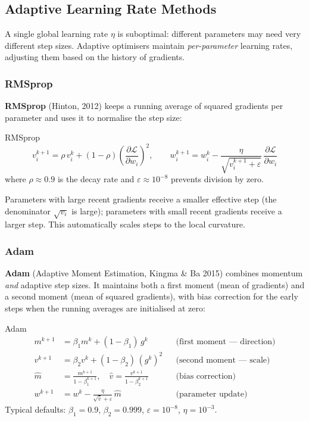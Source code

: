 \documentclass[11pt,a4paper]{article}
\newcommand{\term}[1]{\textcolor{DefGreen}{\textbf{#1}}\index{#1}}
\begin{document}
\subsection{Adaptive Learning Rate Methods}

A single global learning rate $\eta$ is suboptimal: different parameters may need very different step sizes. Adaptive optimisers maintain \emph{per-parameter} learning rates, adjusting them based on the history of gradients.

\subsubsection{RMSprop}

\term{RMSprop} (Hinton, 2012) keeps a running average of squared gradients per parameter and uses it to normalise the step size:

\begin{defbox}{RMSprop}
\[
v_i^{k+1} = \rho\, v_i^k + (1-\rho)\left(\frac{\partial \mathcal{L}}{\partial w_i}\right)^{\!2}, \qquad
w_i^{k+1} = w_i^k - \frac{\eta}{\sqrt{v_i^{k+1} + \varepsilon}}\,\frac{\partial \mathcal{L}}{\partial w_i}
\]
where $\rho \approx 0.9$ is the decay rate and $\varepsilon \approx 10^{-8}$ prevents division by zero.
\end{defbox}

Parameters with large recent gradients receive a smaller effective step (the denominator $\sqrt{v_i}$ is large); parameters with small recent gradients receive a larger step. This automatically scales steps to the local curvature.

\subsubsection{Adam}

\term{Adam} (Adaptive Moment Estimation, Kingma \& Ba 2015) combines momentum \emph{and} adaptive step sizes. It maintains both a first moment (mean of gradients) and a second moment (mean of squared gradients), with bias correction for the early steps when the running averages are initialised at zero:

\begin{defbox}{Adam}
\begin{align*}
m^{k+1} &= \beta_1 m^k + (1-\beta_1)\,g^k & &\text{(first moment — direction)} \\
v^{k+1} &= \beta_2 v^k + (1-\beta_2)\,(g^k)^2 & &\text{(second moment — scale)} \\
\hat{m}  &= \frac{m^{k+1}}{1-\beta_1^{k+1}}, \quad \hat{v} = \frac{v^{k+1}}{1-\beta_2^{k+1}} & &\text{(bias correction)} \\
w^{k+1} &= w^k - \frac{\eta}{\sqrt{\hat{v}} + \varepsilon}\,\hat{m} & &\text{(parameter update)}
\end{align*}
Typical defaults: $\beta_1 = 0.9$, $\beta_2 = 0.999$, $\varepsilon = 10^{-8}$, $\eta = 10^{-3}$.
\end{defbox}
\end{document}
